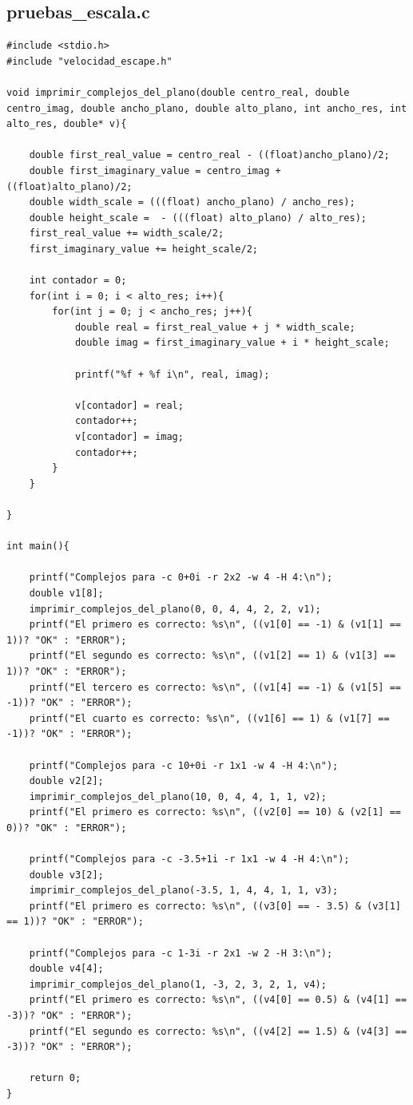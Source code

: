 \documentclass[a4paper,10pt]{article}
\begin{document}
\subsection{pruebas_escala.c}
\begin{verbatim}
#include <stdio.h>
#include "velocidad_escape.h"

void imprimir_complejos_del_plano(double centro_real, double centro_imag, double ancho_plano, double alto_plano, int ancho_res, int alto_res, double* v){
	
	double first_real_value = centro_real - ((float)ancho_plano)/2;
    double first_imaginary_value = centro_imag + ((float)alto_plano)/2;
    double width_scale = (((float) ancho_plano) / ancho_res);
    double height_scale =  - (((float) alto_plano) / alto_res);
    first_real_value += width_scale/2;
    first_imaginary_value += height_scale/2;
    
	int contador = 0;
    for(int i = 0; i < alto_res; i++){
        for(int j = 0; j < ancho_res; j++){
			double real = first_real_value + j * width_scale;
			double imag = first_imaginary_value + i * height_scale;
			
			printf("%f + %f i\n", real, imag);
			
			v[contador] = real;
			contador++;
			v[contador] = imag;
			contador++;
		}
	}

}

int main(){

	printf("Complejos para -c 0+0i -r 2x2 -w 4 -H 4:\n");
    double v1[8];
    imprimir_complejos_del_plano(0, 0, 4, 4, 2, 2, v1);
	printf("El primero es correcto: %s\n", ((v1[0] == -1) & (v1[1] == 1))? "OK" : "ERROR");
	printf("El segundo es correcto: %s\n", ((v1[2] == 1) & (v1[3] == 1))? "OK" : "ERROR");
	printf("El tercero es correcto: %s\n", ((v1[4] == -1) & (v1[5] == -1))? "OK" : "ERROR");
	printf("El cuarto es correcto: %s\n", ((v1[6] == 1) & (v1[7] == -1))? "OK" : "ERROR");
	
	printf("Complejos para -c 10+0i -r 1x1 -w 4 -H 4:\n");
    double v2[2];
    imprimir_complejos_del_plano(10, 0, 4, 4, 1, 1, v2);
	printf("El primero es correcto: %s\n", ((v2[0] == 10) & (v2[1] == 0))? "OK" : "ERROR");
	
	printf("Complejos para -c -3.5+1i -r 1x1 -w 4 -H 4:\n");
    double v3[2];
    imprimir_complejos_del_plano(-3.5, 1, 4, 4, 1, 1, v3);
	printf("El primero es correcto: %s\n", ((v3[0] == - 3.5) & (v3[1] == 1))? "OK" : "ERROR");
	
	printf("Complejos para -c 1-3i -r 2x1 -w 2 -H 3:\n");
    double v4[4];
    imprimir_complejos_del_plano(1, -3, 2, 3, 2, 1, v4);
	printf("El primero es correcto: %s\n", ((v4[0] == 0.5) & (v4[1] == -3))? "OK" : "ERROR");
	printf("El segundo es correcto: %s\n", ((v4[2] == 1.5) & (v4[3] == -3))? "OK" : "ERROR");
	
	return 0;
}

\end{verbatim}
\end{document}
